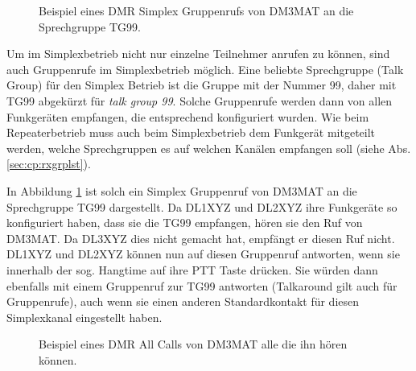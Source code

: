 \begin{figure}[!ht]
  \centering
  \caption{Beispiel eines DMR Simplex Gruppenrufs von DM3MAT an die Sprechgruppe TG99.} \label{fig:splxgc}
\end{figure}

Um im Simplexbetrieb nicht nur einzelne Teilnehmer anrufen zu können, sind auch Gruppenrufe im Simplexbetrieb möglich. Eine beliebte Sprechgruppe (Talk Group) für den Simplex Betrieb ist die Gruppe mit der Nummer 99, daher mit TG99 abgekürzt für \emph{talk group 99}. Solche Gruppenrufe werden dann von allen Funkgeräten empfangen, die entsprechend konfiguriert wurden. Wie beim Repeaterbetrieb muss auch beim Simplexbetrieb dem Funkgerät mitgeteilt werden, welche Sprechgruppen es auf welchen Kanälen empfangen soll (siehe Abs. \ref{sec:cp:rxgrplst}). 

In Abbildung \ref{fig:splxgc} ist solch ein Simplex Gruppenruf von DM3MAT an die Sprechgruppe TG99 dargestellt. Da DL1XYZ und DL2XYZ ihre Funkgeräte so konfiguriert haben, dass sie die TG99 empfangen, hören sie den Ruf von DM3MAT. Da DL3XYZ dies nicht gemacht hat, empfängt er diesen Ruf nicht. DL1XYZ und DL2XYZ können nun auf diesen Gruppenruf antworten, wenn sie innerhalb der sog. Hangtime auf ihre PTT Taste drücken. Sie würden dann ebenfalls mit einem Gruppenruf zur TG99 antworten (Talkaround gilt auch für Gruppenrufe), auch wenn sie einen anderen Standardkontakt für diesen Simplexkanal eingestellt haben.

\begin{figure}[!ht]
  \centering
  \caption{Beispiel eines DMR All Calls von DM3MAT alle die ihn hören können.} \label{fig:splxac}
\end{figure}

